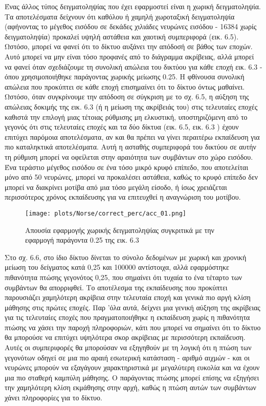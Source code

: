 \documentclass[12pt]{report}
\begin{document}
Ένας άλλος τύπος δειγματοληψίας που έχει εφαρμοστεί είναι η χωρική δειγματοληψία. Τα αποτελέσματα δείχνουν ότι καθόλου ή χαμηλή χωροταξική δειγματοληψία (αφήνοντας το μέγεθος εισόδου σε δεκάδες χιλιάδες νευρώνες εισόδου - 16384 χωρίς δειγματοληψία) προκαλεί υψηλή αστάθεια και χαοτική συμπεριφορά (εικ. 6.5). Ωστόσο, μπορεί να φανεί ότι το δίκτυο αυξάνει την απόδοσή σε βάθος των εποχών. Αυτό μπορεί να μην είναι τόσο προφανές από το διάγραμμα ακρίβειας, αλλά μπορεί να φανεί όταν σχεδιάζουμε τη συνολική απώλεια του δικτύου για κάθε εποχή εικ. 6.3 - όπου χρησιμοποιήθηκε παράγοντας χωρικής μείωσης 0.25. Η φθίνουσα συνολική απώλεια που προκύπτει σε κάθε εποχή επισημαίνει ότι το δίκτυο όντως μαθαίνει. Ωστόσο, όταν συγκρίνουμε την απόδοση σε σύγκριση με το σχ. 6.5, η αύξηση της απώλειας δοκιμής της εικ. 6.3 (ή η μείωση της ακρίβειάς του) στις τελευταίες εποχές καθιστά την επιλογή μιας τέτοιας ρύθμισης μη ελκυστική, υποστηριζόμενη από το γεγονός ότι στις τελευταίες εποχές και τα δύο δίκτυα (εικ. 6.5, εικ. 6.3 ) έχουν επιτύχει παρόμοια αποτελέσματα, αν και θα πρέπει να γίνει περαιτέρω εκπαίδευση για πιο καταληκτικά αποτελέσματα. Αυτή η ασταθής συμπεριφορά του δικτύου σε αυτήν τη ρύθμιση μπορεί να οφείλεται στην αραιότητα των συμβάντων στο χώρο εισόδου. Ένα τεράστιο μέγεθος εισόδου σε ένα τόσο μικρό κρυφό επίπεδο, που αποτελείται μόνο από 50 νευρώνες, μπορεί να προκαλέσει αστάθεια, καθώς το κρυφό επίπεδο δεν μπορεί να διακρίνει μοτίβα από μια τόσο μεγάλη είσοδο, ή ίσως χρειάζεται περισσότερος χρόνος εκπαίδευσης για να επιτευχθεί η αναγνώριση του μοτίβου.

\begin{figure}[htp] %
    \centering
     \texttt{[image: plots/Norse/correct\_perc/acc\_01.png]}
    \caption{Απουσία εφαρμογής χωρικής δειγματοληψίας συγκριτικά με την εφαρμογή παράγοντα 0.25 της εικ. 6.3}
    \label{fig:representation-methods}
\end{figure}

Στο σχ. 6.6, στο ίδιο δίκτυο δίνεται το σύνολο δεδομένων με χωρική και χρονική μείωση του δείγματος κατά 0,25 και 100000 αντίστοιχα, αλλά εφαρμόστηκε πιθανότητα πτώσης γεγονότος 0,25, που σημαίνει ότι τυχαία το ένα τέταρτο των συμβάντων θα απορριφθεί. Το αποτέλεσμα της εκπαίδευσης που προκύπτει παρουσιάζει χαμηλότερη ακρίβεια στην τελευταία εποχή και γενικά πιο αργή κλίση μάθησης στις πρώτες εποχές. Παρ 'όλα αυτά, δείχνει μια γενική αύξηση της ακρίβειας για τις τελευταίες εποχές που πραγματοποιήθηκε η εκπαίδευση χωρίς η πιθανότητα πτώσης να χάσει την παροχή πληροφοριών, κάτι που μπορεί να σημαίνει ότι το δίκτυο θα μπορούσε να επιτύχει υψηλότερα σκορ ακρίβειας με περισσότερη εκπαίδευση. Αυτές οι συμπεριφορές θα μπορούσαν να εξηγηθούν με τη λογική ότι η πτώση των γεγονότων οδηγεί σε μια πιο αραιή εσωτερική κατάσταση - αριθμό αιχμών - και οι νευρώνες μπορούν να εξαγάγουν χαρακτηριστικά με μεγαλύτερη ευκολία και να έχουν μια πιο σταθερή καμπύλη μάθησης. Ο παράγοντας πτώσης μπορεί επίσης να εξηγήσει την χαμηλότερη κλίση εκμάθησης στην αρχή, καθώς η πτώση αυτών των συμβάντων χάνει πληροφορίες για το δίκτυο.
\end{document}
